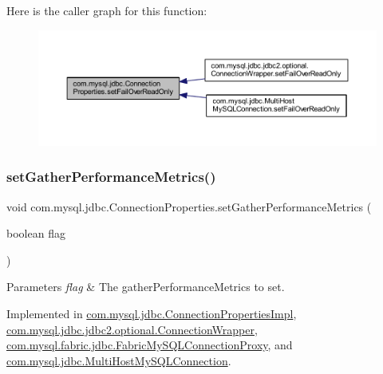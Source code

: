 Here is the caller graph for this function\+:\nopagebreak
\begin{figure}[H]
\begin{center}
\leavevmode
\includegraphics[width=350pt]{interfacecom_1_1mysql_1_1jdbc_1_1_connection_properties_acc1561f34ff6aaa02a3a6c0e6184644f_icgraph}
\end{center}
\end{figure}
\mbox{\label{interfacecom_1_1mysql_1_1jdbc_1_1_connection_properties_a8083ba3dcac8d6d8ec42c635f0f19be4}} 
\subsubsection{\texorpdfstring{set\+Gather\+Performance\+Metrics()}{setGatherPerformanceMetrics()}}
{\footnotesize\ttfamily void com.\+mysql.\+jdbc.\+Connection\+Properties.\+set\+Gather\+Performance\+Metrics (\begin{DoxyParamCaption}\item[{boolean}]{flag }\end{DoxyParamCaption})}


\begin{DoxyParams}{Parameters}
{\em flag} & The gather\+Performance\+Metrics to set. \\
\hline
\end{DoxyParams}


Implemented in \mbox{\hyperlink{classcom_1_1mysql_1_1jdbc_1_1_connection_properties_impl_a2a1efea1f2a6d8de6700a188a7d10341}{com.\+mysql.\+jdbc.\+Connection\+Properties\+Impl}}, \mbox{\hyperlink{classcom_1_1mysql_1_1jdbc_1_1jdbc2_1_1optional_1_1_connection_wrapper_a245c02868e2569c0144af26ede2258e9}{com.\+mysql.\+jdbc.\+jdbc2.\+optional.\+Connection\+Wrapper}}, \mbox{\hyperlink{classcom_1_1mysql_1_1fabric_1_1jdbc_1_1_fabric_my_s_q_l_connection_proxy_a1c421f9dd75e3b5a200b4eaacd9d1a8b}{com.\+mysql.\+fabric.\+jdbc.\+Fabric\+My\+S\+Q\+L\+Connection\+Proxy}}, and \mbox{\hyperlink{classcom_1_1mysql_1_1jdbc_1_1_multi_host_my_s_q_l_connection_a06b568a697c11663a400405c5c8998cb}{com.\+mysql.\+jdbc.\+Multi\+Host\+My\+S\+Q\+L\+Connection}}.

